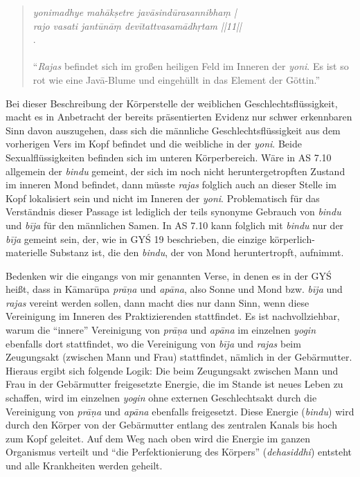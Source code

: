 \documentclass[a4paper,12pt]{article}
\begin{document}
    \begin{quote} \textit{yonimadhye mahākṣetre javāsindūrasannibhaṃ |\\ rajo vasati jantūnāṃ devītattvasamādhṛtam ||11||}\\ \parencite[10]{asiddhi}. \\ \\``\textit{Rajas} befindet sich im großen heiligen Feld im Inneren der \textit{yoni}. Es ist so rot wie eine Javā-Blume und eingehüllt in das Element der Göttin.'' \end{quote}

    Bei dieser Beschreibung der Körperstelle der weiblichen Geschlechtsflüssigkeit, macht es in Anbetracht der bereits präsentierten Evidenz nur schwer erkennbaren Sinn davon auszugehen, dass sich die männliche Geschlechtsflüssigkeit aus dem vorherigen Vers im Kopf befindet und die weibliche in der \textit{yoni}. Beide Sexualflüssigkeiten befinden sich im unteren Körperbereich. Wäre in AS 7.10 allgemein der \textit{bindu} gemeint, der sich im noch nicht heruntergetropften Zustand im inneren Mond befindet, dann müsste \textit{rajas} folglich auch an dieser Stelle im Kopf lokalisiert sein und nicht im Inneren der \textit{yoni}. Problematisch für das Verständnis dieser Passage ist lediglich der teils synonyme Gebrauch von \textit{bindu} und \textit{bīja} für den männlichen Samen. In AS 7.10 kann folglich mit \textit{bindu} nur der \textit{bīja} gemeint sein, der, wie in GYŚ 19 beschrieben, die einzige körperlich-materielle Substanz ist, die den \textit{bindu}, der von Mond heruntertropft, aufnimmt. 

    Bedenken wir die eingangs von mir genannten Verse, in denen es in der GYŚ heißt, dass in Kāmarūpa \textit{prāṇa} und \textit{apāna}, also Sonne und Mond bzw. \textit{bīja} und \textit{rajas} vereint werden sollen, dann macht dies nur dann Sinn, wenn diese Vereinigung im Inneren des Praktizierenden stattfindet. Es ist nachvollziehbar, warum die ``innere'' Vereinigung von \textit{prāṇa} und \textit{apāna} im einzelnen \textit{yogin} ebenfalls dort stattfindet, wo die  Vereinigung von \textit{bīja} und \textit{rajas} beim Zeugungsakt (zwischen Mann und Frau) stattfindet, nämlich in der Gebärmutter. Hieraus ergibt sich folgende Logik: Die beim Zeugungsakt zwischen Mann und Frau in der Gebärmutter freigesetzte Energie, die im Stande ist neues Leben zu schaffen, wird im einzelnen \textit{yogin} ohne externen Geschlechtsakt durch die Vereinigung von \textit{prāṇa} und \textit{apāna} ebenfalls freigesetzt. Diese Energie (\textit{bindu}) wird durch den Körper von der Gebärmutter entlang des zentralen Kanals bis hoch zum Kopf geleitet. Auf dem Weg nach oben wird die Energie im ganzen Organismus verteilt und ``die Perfektionierung des Körpers'' (\textit{dehasiddhi}) entsteht und alle Krankheiten werden geheilt. 
\end{document}
